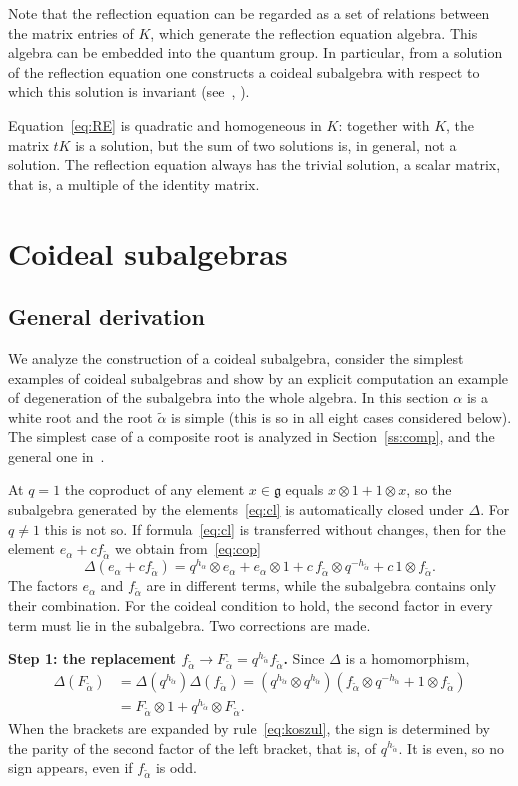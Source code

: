 \documentclass[12pt,a4paper]{article}
\newcommand{\g}{\mathfrak{g}}
\newcommand{\ta}{\tilde\alpha}
\newcommand{\ot}{\otimes}
\begin{document}
Note that the reflection equation can be regarded as a set of relations between the matrix entries of $K$, which generate the reflection equation algebra. This algebra can be embedded into the quantum group. In particular, from a solution of the reflection equation one constructs a coideal subalgebra with respect to which this solution is invariant (see~\cite{K}, \cite{AMS}).

Equation~\eqref{eq:RE} is quadratic and homogeneous in $K$: together with $K$, the matrix $tK$ is a solution, but the sum of two solutions is,
in general, not a solution. The reflection equation always has the trivial solution, a scalar matrix, that is, a multiple of the identity matrix.


\section{Coideal subalgebras}


\subsection{General derivation}\label{ss:gen}
We analyze the construction of a coideal subalgebra, consider the simplest examples of coideal subalgebras and show by an explicit computation an example of degeneration of the subalgebra into the whole algebra. In this section $\alpha$ is a white root and the root $\ta$ is simple (this is so in all eight cases considered below). The simplest case of a composite root is analyzed in Section~\ref{ss:comp}, and the general one in~\cite[Section~5]{AMS}.

At $q=1$ the coproduct of any element $x\in\g$ equals $x\ot1+1\ot x$, so the subalgebra generated by the elements~\eqref{eq:cl} is automatically closed under $\Delta$. For $q\neq1$ this is not so. If formula~\eqref{eq:cl} is transferred without changes, then for the element $e_\alpha+cf_{\ta}$ we obtain from~\eqref{eq:cop}
\[
\Delta(e_\alpha+cf_{\ta})=q^{h_\alpha}\ot e_\alpha+e_\alpha\ot1+c\,f_{\ta}\ot q^{-h_{\ta}}+c\,1\ot f_{\ta}.
\]
The factors $e_\alpha$ and $f_{\ta}$ are in different terms, while the subalgebra contains only their combination. For the coideal condition to hold, the second factor in every term must lie in the subalgebra. Two corrections are made.

\textbf{Step 1: the replacement $f_{\ta}\to F_{\ta}=q^{h_{\ta}}f_{\ta}$.} Since $\Delta$ is a homomorphism,
\begin{align*}
\Delta(F_{\ta})&=\Delta(q^{h_{\ta}})\Delta(f_{\ta})=(q^{h_{\ta}}\ot q^{h_{\ta}})(f_{\ta}\ot q^{-h_{\ta}}+1\ot f_{\ta})\\
&=F_{\ta}\ot1+q^{h_{\ta}}\ot F_{\ta}.
\end{align*}
When the brackets are expanded by rule~\eqref{eq:koszul}, the sign is determined by the parity of the second factor of the left bracket, that is, of $q^{h_{\ta}}$. It is even, so no sign appears, even if $f_{\ta}$ is odd.
\end{document}
